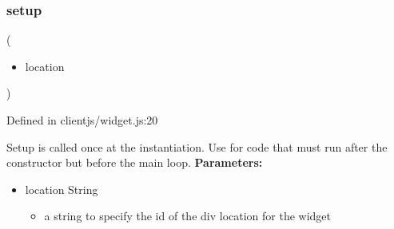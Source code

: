 \documentclass[10pt]{article}
\begin{document}
\subsubsection*{setup}
(\begin{itemize}
\item location

\end{itemize}
)

  Defined in clientjs/widget.js:20


 Setup is called once at the instantiation. Use for code that must run after the constructor but before the main loop.
\textbf{Parameters:}
\begin{itemize}
\item location String\begin{itemize}
\item a string to specify the id of the div location for the widget

\end{itemize}


\end{itemize}
\end{document}
